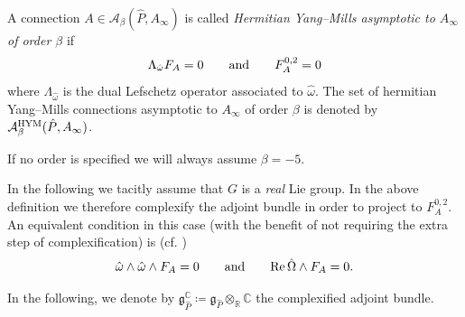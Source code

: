 \documentclass[11pt,a4paper]{scrartcl}
\newcommand{\ita}[1]{\textit{#1}}
\newcommand{\re}{\textup{Re}\thinspace }
\numberwithin{equation}{section}
\theoremstyle{plain}
\theoremstyle{definition}
\theoremstyle{remark}
\begin{document}
\begin{definition}\label{def:HYMconnection}
A connection $A\in \mathcal{A}_\beta(\hat{P},A_\infty)$ is called \ita{Hermitian Yang--Mills asymptotic to $A_\infty$ of order $\beta$} if \[ \Lambda_{\hat{\omega}} F_A = 0 \qquad \textup{and} \qquad F_A^{0,2} = 0 \] where $\Lambda_{\hat{\omega}}$ is the dual Lefschetz operator associated to $\hat{\omega}$. The set of hermitian Yang--Mills connections asymptotic to $A_\infty$ of order $\beta$ is denoted by $ \mathcal{A}^{\textup{HYM}}_{\beta}(\hat{P},A_\infty)$.
\end{definition}
\begin{remark}
If no order is specified we will always assume $\beta = -5$.
\end{remark}
\begin{remark}\label{rem:HYMaltCondition}
In the following we tacitly assume that $G$ is a \ita{real} Lie group. In the above definition we therefore complexify the adjoint bundle in order to project to $F_A^{0,2}$. An equivalent condition in this case (with the benefit of not requiring the extra step of complexification) is (cf. \cite[Proposition~1.2.30]{Huybrechts-Complex}) \[ \hat{\omega} \wedge \hat{\omega} \wedge F_A = 0 \qquad \textup{and} \qquad \re \hat{\Omega} \wedge F_A = 0. \]
\end{remark}

In the following, we denote by $\mathfrak{g}_{\hat{P}}^\mathbb{C} \coloneqq \mathfrak{g}_{\hat{P}}\otimes_\mathbb{R} \mathbb{C}$ the complexified adjoint bundle.
\end{document}
